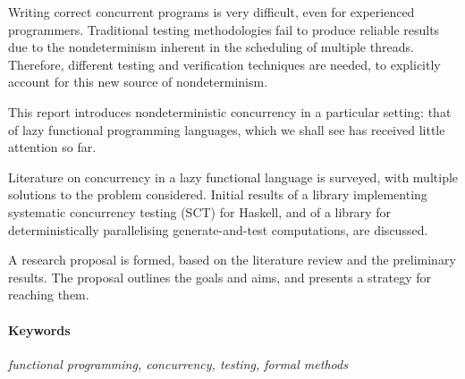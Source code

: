 Writing correct concurrent programs is very difficult, even for
experienced programmers. Traditional testing methodologies fail to
produce reliable results due to the nondeterminism inherent in the
scheduling of multiple threads. Therefore, different testing and
verification techniques are needed, to explicitly account for this new
source of nondeterminism.

This report introduces nondeterministic concurrency in a particular
setting: that of lazy functional programming languages, which we shall
see has received little attention so far.

Literature on concurrency in a lazy functional language is surveyed,
with multiple solutions to the problem considered. Initial results of
a library implementing systematic concurrency testing (SCT) for
Haskell, and of a library for deterministically parallelising
generate-and-test computations, are discussed.

A research proposal is formed, based on the literature review and the
preliminary results. The proposal outlines the goals and aims, and
presents a strategy for reaching them.

\vfill

\paragraph{Keywords}

\textit{functional programming, concurrency,
  testing, formal methods}